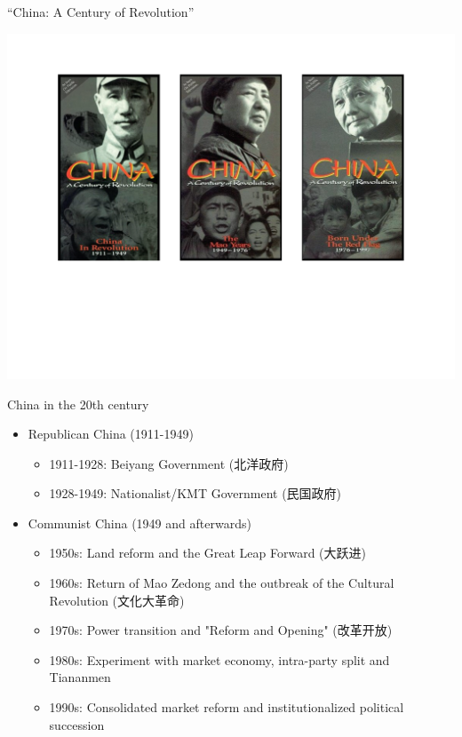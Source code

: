 \documentclass[
  10pt,
  ignorenonframetext,
]{beamer}
\begin{document}
\begin{frame}{``China: A Century of Revolution''}
\protect\hypertarget{china-a-century-of-revolution}{}
\begin{center}\includegraphics[width=0.95\linewidth]{Figs/docs} \end{center}
\end{frame}

\begin{frame}{China in the 20th century}
\protect\hypertarget{china-in-the-20th-century}{}
\begin{itemize}
  \item Republican China (1911-1949)
  \vspace{0.2cm}
  \begin{itemize}
    \item 1911-1928: Beiyang Government (北洋政府)
    \item 1928-1949: Nationalist/KMT Government (民国政府) 
  \end{itemize}
  \vspace{0.4cm}
  \item Communist China (1949 and afterwards)
  \vspace{0.2cm}
  \begin{itemize}
    \item 1950s: Land reform and the Great Leap Forward (大跃进)
    \item 1960s: Return of Mao Zedong and the outbreak of the Cultural Revolution (文化大革命)
    \item 1970s: Power transition and "Reform and Opening" (改革开放)
    \item 1980s: Experiment with market economy, intra-party split and Tiananmen
    \item 1990s: Consolidated market reform and institutionalized political succession
  \end{itemize}
\end{itemize}
\end{frame}
\end{document}
